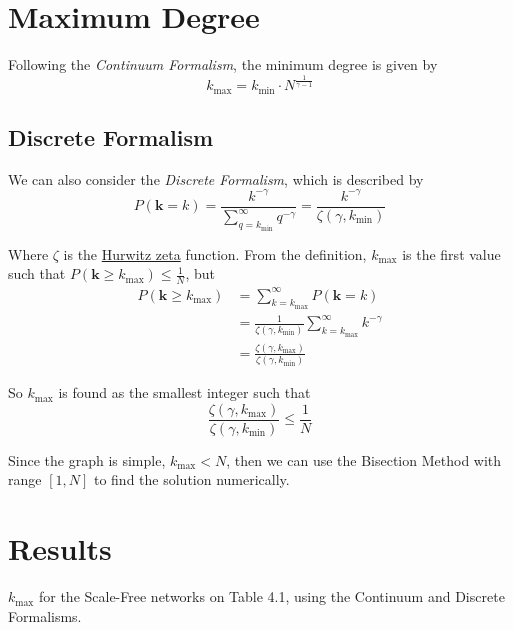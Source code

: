 \section{Maximum Degree}

    Following the \textit{Continuum Formalism}, the minimum degree is given by
    \[
        k_{\max} = k_{\min} \cdot N^{\frac{1}{\gamma - 1}}
    \]

\subsection{Discrete Formalism}

    We can also consider the \textit{Discrete Formalism}, which is described by
    \[
        P(\mathbf{k} = k) = \frac{k^{-\gamma}}{\sum_{q = k_{\min}}^\infty q^{-\gamma}} = \frac{k^{-\gamma}}{\zeta(\gamma, k_{\min})}
    \]

    Where $\zeta$ is the \href{https://en.wikipedia.org/wiki/Hurwitz_zeta_function}{Hurwitz zeta} function. From the definition, $k_{\max}$ is the first value such that $P(\mathbf{k} \geq k_{\max}) \leq \frac{1}{N}$, but
    \begin{align*}
        P(\mathbf{k} \geq k_{\max})
        &= \sum_{k = k_{\max}}^\infty P(\mathbf{k} = k) \\
        &= \frac{1}{\zeta(\gamma, k_{\min})} \sum_{k = k_{\max}}^\infty k^{-\gamma} \\
        &= \frac{\zeta(\gamma, k_{\max})}{\zeta(\gamma, k_{\min})}
    \end{align*}

    So $k_{\max}$ is found as the smallest integer such that
    \[
        \frac{\zeta(\gamma, k_{\max})}{\zeta(\gamma, k_{\min})} \leq \frac{1}{N}
    \]

    Since the graph is simple, $k_{\max} < N$, then we can use the Bisection Method with range $[1, N]$ to find the solution numerically.

\section{Results}

    \begin{table}[H]
        \centering
        

        \caption{$k_{\max}$ for the Scale-Free networks on Table 4.1, using the Continuum and Discrete Formalisms.}
        \label{tab:results}
    \end{table}
